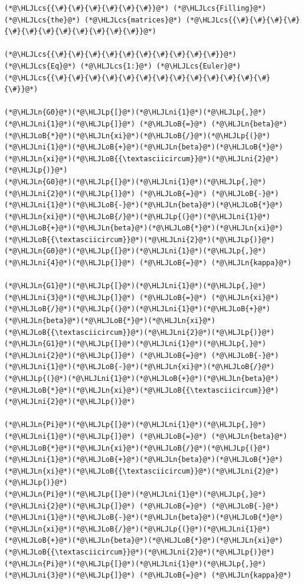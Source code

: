 \documentclass[12pt,a4paper]{article}
\newcommand{\HLJLn}[1]{#1}
\newcommand{\HLJLni}[1]{\textcolor[RGB]{59,151,46}{#1}}
\newcommand{\HLJLoB}[1]{\textcolor[RGB]{102,102,102}{\textbf{#1}}}
\newcommand{\HLJLp}[1]{#1}
\newcommand{\HLJLcs}[1]{\textcolor[RGB]{153,153,119}{\textit{#1}}}
\begin{document}
\begin{lstlisting}
(*@\HLJLcs{{\#}{\#}{\#}{\#}{\#}{\#}}@*) (*@\HLJLcs{Filling}@*) (*@\HLJLcs{the}@*) (*@\HLJLcs{matrices}@*) (*@\HLJLcs{{\#}{\#}{\#}{\#}{\#}{\#}{\#}{\#}{\#}{\#}{\#}{\#}}@*)

(*@\HLJLcs{{\#}{\#}{\#}{\#}{\#}{\#}{\#}{\#}{\#}{\#}}@*) (*@\HLJLcs{Eq}@*) (*@\HLJLcs{1:}@*) (*@\HLJLcs{Euler}@*) (*@\HLJLcs{{\#}{\#}{\#}{\#}{\#}{\#}{\#}{\#}{\#}{\#}{\#}{\#}{\#}{\#}}@*)

(*@\HLJLn{G0}@*)(*@\HLJLp{[}@*)(*@\HLJLni{1}@*)(*@\HLJLp{,}@*)(*@\HLJLni{1}@*)(*@\HLJLp{]}@*) (*@\HLJLoB{=}@*) (*@\HLJLn{beta}@*)(*@\HLJLoB{*}@*)(*@\HLJLn{xi}@*)(*@\HLJLoB{/}@*)(*@\HLJLp{(}@*)(*@\HLJLni{1}@*)(*@\HLJLoB{+}@*)(*@\HLJLn{beta}@*)(*@\HLJLoB{*}@*)(*@\HLJLn{xi}@*)(*@\HLJLoB{{\textasciicircum}}@*)(*@\HLJLni{2}@*)(*@\HLJLp{)}@*)
(*@\HLJLn{G0}@*)(*@\HLJLp{[}@*)(*@\HLJLni{1}@*)(*@\HLJLp{,}@*)(*@\HLJLni{2}@*)(*@\HLJLp{]}@*) (*@\HLJLoB{=}@*) (*@\HLJLoB{-}@*)(*@\HLJLni{1}@*)(*@\HLJLoB{-}@*)(*@\HLJLn{beta}@*)(*@\HLJLoB{*}@*)(*@\HLJLn{xi}@*)(*@\HLJLoB{/}@*)(*@\HLJLp{(}@*)(*@\HLJLni{1}@*)(*@\HLJLoB{+}@*)(*@\HLJLn{beta}@*)(*@\HLJLoB{*}@*)(*@\HLJLn{xi}@*)(*@\HLJLoB{{\textasciicircum}}@*)(*@\HLJLni{2}@*)(*@\HLJLp{)}@*)
(*@\HLJLn{G0}@*)(*@\HLJLp{[}@*)(*@\HLJLni{1}@*)(*@\HLJLp{,}@*)(*@\HLJLni{4}@*)(*@\HLJLp{]}@*) (*@\HLJLoB{=}@*) (*@\HLJLn{kappa}@*)

(*@\HLJLn{G1}@*)(*@\HLJLp{[}@*)(*@\HLJLni{1}@*)(*@\HLJLp{,}@*)(*@\HLJLni{3}@*)(*@\HLJLp{]}@*) (*@\HLJLoB{=}@*) (*@\HLJLn{xi}@*)(*@\HLJLoB{/}@*)(*@\HLJLp{(}@*)(*@\HLJLni{1}@*)(*@\HLJLoB{+}@*)(*@\HLJLn{beta}@*)(*@\HLJLoB{*}@*)(*@\HLJLn{xi}@*)(*@\HLJLoB{{\textasciicircum}}@*)(*@\HLJLni{2}@*)(*@\HLJLp{)}@*)
(*@\HLJLn{G1}@*)(*@\HLJLp{[}@*)(*@\HLJLni{1}@*)(*@\HLJLp{,}@*)(*@\HLJLni{2}@*)(*@\HLJLp{]}@*) (*@\HLJLoB{=}@*) (*@\HLJLoB{-}@*)(*@\HLJLni{1}@*)(*@\HLJLoB{-}@*)(*@\HLJLn{xi}@*)(*@\HLJLoB{/}@*)(*@\HLJLp{(}@*)(*@\HLJLni{1}@*)(*@\HLJLoB{+}@*)(*@\HLJLn{beta}@*)(*@\HLJLoB{*}@*)(*@\HLJLn{xi}@*)(*@\HLJLoB{{\textasciicircum}}@*)(*@\HLJLni{2}@*)(*@\HLJLp{)}@*)

(*@\HLJLn{Pi}@*)(*@\HLJLp{[}@*)(*@\HLJLni{1}@*)(*@\HLJLp{,}@*)(*@\HLJLni{1}@*)(*@\HLJLp{]}@*) (*@\HLJLoB{=}@*) (*@\HLJLn{beta}@*)(*@\HLJLoB{*}@*)(*@\HLJLn{xi}@*)(*@\HLJLoB{/}@*)(*@\HLJLp{(}@*)(*@\HLJLni{1}@*)(*@\HLJLoB{+}@*)(*@\HLJLn{beta}@*)(*@\HLJLoB{*}@*)(*@\HLJLn{xi}@*)(*@\HLJLoB{{\textasciicircum}}@*)(*@\HLJLni{2}@*)(*@\HLJLp{)}@*)
(*@\HLJLn{Pi}@*)(*@\HLJLp{[}@*)(*@\HLJLni{1}@*)(*@\HLJLp{,}@*)(*@\HLJLni{2}@*)(*@\HLJLp{]}@*) (*@\HLJLoB{=}@*) (*@\HLJLoB{-}@*)(*@\HLJLni{1}@*)(*@\HLJLoB{-}@*)(*@\HLJLn{beta}@*)(*@\HLJLoB{*}@*)(*@\HLJLn{xi}@*)(*@\HLJLoB{/}@*)(*@\HLJLp{(}@*)(*@\HLJLni{1}@*)(*@\HLJLoB{+}@*)(*@\HLJLn{beta}@*)(*@\HLJLoB{*}@*)(*@\HLJLn{xi}@*)(*@\HLJLoB{{\textasciicircum}}@*)(*@\HLJLni{2}@*)(*@\HLJLp{)}@*)
(*@\HLJLn{Pi}@*)(*@\HLJLp{[}@*)(*@\HLJLni{1}@*)(*@\HLJLp{,}@*)(*@\HLJLni{3}@*)(*@\HLJLp{]}@*) (*@\HLJLoB{=}@*) (*@\HLJLn{kappa}@*)


\end{lstlisting}
\end{document}
